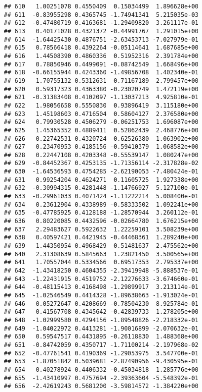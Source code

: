 \documentclass[
]{article}
\begin{document}
\begin{verbatim}
## 610   1.00251078 0.4550409  0.15034499  1.896628e+00
## 611  -0.83955298 0.4365745 -1.74941341  5.215035e-03
## 612  -0.47480719 0.4163681 -1.29409820  3.261117e-01
## 613   0.40171028 0.4321372 -0.44991767  1.291015e+00
## 614  -1.64425430 0.4876751 -2.63453713 -7.027979e-01
## 615   0.78566418 0.4392264 -0.05114641  1.687685e+00
## 616   1.44508390 0.4860336  0.51952316  2.391784e+00
## 617   0.78850946 0.4499091 -0.08742549  1.668496e+00
## 618  -0.66155944 0.4243360 -1.49856708  1.402340e-01
## 619   1.70755132 0.5312631  0.71167189  2.799457e+00
## 620   0.59317323 0.4363380 -0.23020749  1.472119e+00
## 621  -0.31383408 0.4102097 -1.13037213  4.925810e-01
## 622   1.98056658 0.5550830  0.93896419  3.115180e+00
## 623   1.45198603 0.4716504  0.58604127  2.376580e+00
## 624   0.79930528 0.4506279 -0.06251753  1.696087e+00
## 625   1.45365352 0.4889411  0.52862439  2.468776e+00
## 626   0.22742531 0.4320724 -0.62526380  1.063902e+00
## 627   0.23470953 0.4185156 -0.59410379  1.068582e+00
## 628   0.22447108 0.4203348 -0.55539147  1.080247e+00
## 629  -0.84452367 0.4253135 -1.71356114 -2.317828e-02
## 630  -1.64536593 0.4754285 -2.62190053 -7.480424e-01
## 631   0.99254204 0.4624271  0.11605725  1.927338e+00
## 632  -0.30994315 0.4281448 -1.14766927  5.127100e-01
## 633  -0.29961033 0.4071424 -1.11222214  5.008400e-01
## 634   0.23612904 0.4338989 -0.58333502  1.092241e+00
## 635  -0.47785925 0.4128188 -1.28570944  3.260112e-01
## 636   0.80220085 0.4432596 -0.02664780  1.676215e+00
## 637   2.29483627 0.5922632  1.22259101  3.508239e+00
## 638   0.40597421 0.4421945 -0.44468361  1.289240e+00
## 639   1.44350954 0.4968429  0.51481637  2.475562e+00
## 640   2.31308639 0.5845663  1.23821450  3.500565e+00
## 641   1.70557044 0.5334566  0.69517353  2.795337e+00
## 642  -1.43418250 0.4604355 -2.39419948 -5.888537e-01
## 643  -1.22431915 0.4519752 -2.12276633 -3.674660e-01
## 644  -0.48115413 0.4168498 -1.29899917  3.213114e-01
## 645  -1.02546549 0.4414328 -1.89638663 -1.913024e-01
## 646   0.05272647 0.4208669 -0.78504230  8.925784e-01
## 647   0.41567708 0.4345642 -0.42839733  1.278205e+00
## 648  -1.02999580 0.4294156 -1.89548826 -2.218332e-01
## 649  -1.04022972 0.4413281 -1.90016899 -2.070632e-01
## 650   0.59547517 0.4431895 -0.26118830  1.488368e+00
## 651  -0.84742059 0.4350717 -1.71100214 -2.197968e-02
## 652  -0.47761541 0.4190369 -1.29053975  3.547700e-01
## 653  -1.87051842 0.5039681 -2.87490956 -9.430595e-01
## 654   0.40278924 0.4406332 -0.45034818  1.285776e+00
## 655  -1.43410997 0.4757694 -2.39363604 -5.548392e-01
## 656  -2.42619243 0.5681200 -3.59814572 -1.384220e+00

\end{verbatim}
\end{document}
